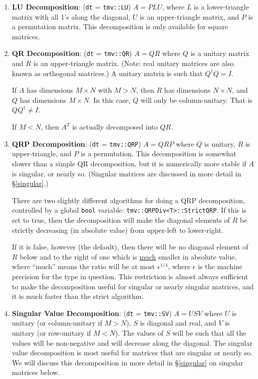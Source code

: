 \documentclass[twoside,letterpaper,11pt]{article}
\renewcommand{\tt}[1]{{\lstinline {#1}}}
\begin{document}
\begin{enumerate}
\item
\textbf{LU Decomposition}: 
(\tt{dt} = \tt{tmv::LU}) $A = P L U$, where $L$ is a lower-triangle 
matrix with all 1's along the diagonal, $U$ is an upper-triangle matrix, 
and $P$ is a permutation matrix.  This decomposition is only available for 
square matrices.

\item
\textbf{QR Decomposition}: 
(\tt{dt} = \tt{tmv::QR}) $A = Q R$ where $Q$ is a unitary matrix
and $R$ is an upper-triangle matrix.  (Note: real unitary matrices are
also known as orthogonal matrices.)  A unitary matrix is such that
$Q^\dagger Q = I$. 

If $A$ has dimensions $M \times N$ with $M > N$, 
then $R$ has dimensions $N \times N$, and $Q$
has dimensions $M \times N$.  In this case, $Q$ will
only be column-unitary.  That is $Q Q^\dagger \neq I$.

If $M < N$, then $A^T$ is actually decomposed into $Q R$.

\item
\textbf{QRP Decomposition}: 
(\tt{dt} = \tt{tmv::QRP}) $A = Q R P$ where $Q$ is unitary, $R$ is 
upper-triangle, and $P$ is a permutation.  This decomposition is somewhat
slower than a simple QR decomposition, but it is numerically more stable if
$A$ is singular, or nearly so.  
(Singular matrices are discussed in more detail in \S\ref{singular}.)

There are two slightly different algorithms for doing a QRP decomposition, controlled by a global
\tt{bool} variable: \tt{tmv::QRPDiv<T>::StrictQRP}.
If this is set to true, then the decomposition will make the diagonal elements
of $R$ be strictly decreasing (in absolute value) from upper-left to lower-right.

If it is false, however (the default), then there will be no diagonal element
of $R$ below and to the right of one which is \underline{much} smaller in absolute value,
where ``much'' means the ratio will be at most $\epsilon^{1/4}$, where 
$\epsilon$ is the machine precision for the type in question.  This restriction
is almost always sufficient to make the decomposition useful for singular or nearly
singular matrices, and it is much faster than the strict algorithm.

\item
\textbf{Singular Value Decomposition}: 
(\tt{dt} = \tt{tmv::SV}) $A = U S V$ where $U$ is unitary
(or column-unitary if $M > N$), $S$ is diagonal and real, and $V$ is unitary 
(or row-unitary if $M < N$).  The values of $S$ will be such that all the values will
be non-negative and will decrease along the diagonal.
The singular value decomposition is most useful
for matrices that are singular or nearly so.  
We will discuss this decomposition in more detail in \S\ref{singular} on
singular matrices below.

\end{enumerate}
\end{document}
